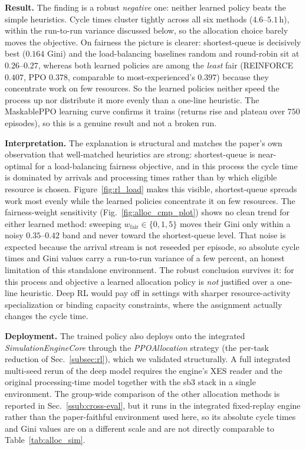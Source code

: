 \textbf{Result.} The finding is a robust \emph{negative} one: neither learned policy beats the simple
heuristics. Cycle times cluster tightly across all six methods ($4.6$--$5.1$\,h), within the
run-to-run variance discussed below, so the allocation choice barely moves the objective. On fairness
the picture is clearer: shortest-queue is decisively best ($0.164$ Gini) and the load-balancing
baselines random and round-robin sit at $0.26$--$0.27$, whereas both learned policies are among the
\emph{least} fair (REINFORCE $0.407$, PPO $0.378$, comparable to most-experienced's $0.397$) because
they concentrate work on few resources. So the learned policies neither speed the process up nor
distribute it more evenly than a one-line heuristic. The MaskablePPO learning curve confirms it
trains (returns rise and plateau over $750$ episodes), so this is a genuine result and not a broken
run.

\textbf{Interpretation.} The explanation is structural and matches the paper's own observation that
well-matched heuristics are strong: shortest-queue is near-optimal for a load-balancing fairness
objective, and in this process the cycle time is dominated by arrivals and processing times rather
than by which eligible resource is chosen. Figure~\ref{fig:rl_load} makes this visible, shortest-queue
spreads work most evenly while the learned policies concentrate it on few resources. The
fairness-weight sensitivity (Fig.~\ref{fig:alloc_cmp_plot}) shows no clean trend for either learned
method: sweeping $w_{\mathrm{fair}}\in\{0,1,5\}$ moves their Gini only within a noisy $0.35$--$0.42$
band and never toward the shortest-queue level. That noise is expected because the arrival stream is
not reseeded per episode, so absolute cycle times and Gini values carry a run-to-run variance of a few
percent, an honest limitation of this standalone environment. The robust conclusion survives it: for
this process and objective a learned allocation policy is \emph{not} justified over a one-line
heuristic. Deep RL would pay off in settings with sharper resource-activity specialization or binding
capacity constraints, where the assignment actually changes the cycle time.

\textbf{Deployment.} The trained policy also deploys onto the integrated \emph{SimulationEngineCore}
through the \emph{PPOAllocation} strategy (the per-task reduction of Sec.~\ref{subsec:rl}), which we
validated structurally. A full integrated multi-seed rerun of the deep model requires the engine's
XES reader and the original processing-time model together with the sb3 stack in a single
environment. The group-wide comparison of the other allocation methods is reported in
Sec.~\ref{ssub:cross-eval}, but it runs in the integrated fixed-replay engine rather than the
paper-faithful environment used here, so its absolute cycle times and Gini values are on a different
scale and are not directly comparable to Table~\ref{tab:alloc_sim}.
